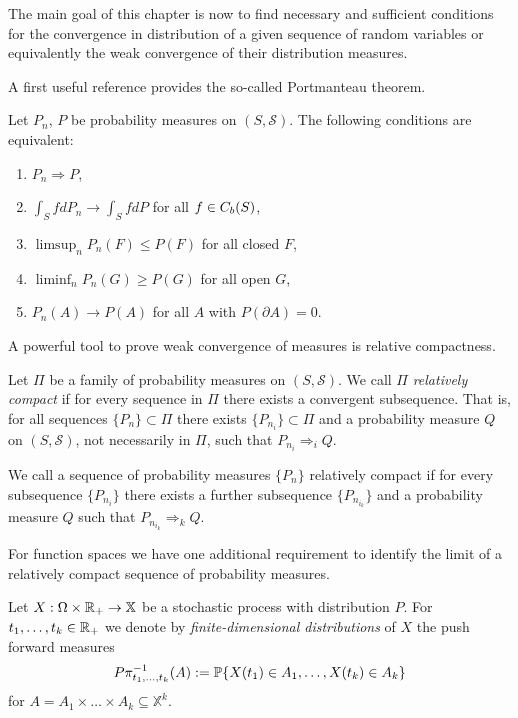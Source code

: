 The main goal of this chapter is now to find necessary and sufficient conditions
for the convergence in distribution of a given sequence of random variables 
or equivalently the weak convergence of their distribution measures.

A first useful reference provides the so-called Portmanteau theorem.
\begin{theorem} \label{T: portmanteau weak}
	Let $P_n$, $P$ be probability measures on $(S, \mathcal{S})$.
	The following conditions are equivalent:
	\begin{enumerate}
		\item $P_n \Rightarrow P$,
		\item $\int_S fdP_n \rightarrow \int_S fdP$ for all $f \in C_b(S)$,
		\item $\limsup_n P_n(F) \leq P(F)$ for all closed $F$,
		\item $\liminf_n P_n(G) \geq P(G)$ for all open $G$,
		\item $P_n(A) \rightarrow P(A)$ for all $A$ with $P(\partial A) = 0$.
	\end{enumerate}
\end{theorem}

\bigskip

A powerful tool to prove weak convergence of measures is relative compactness.
\begin{definition} \label{D: rel compactness}
	Let $\Pi$ be a family of probability measures on $(S, \mathcal{S})$.
	We call $\Pi$ \emph{relatively compact} if for every sequence in $\Pi$ there exists a convergent subsequence.
	That is, for all sequences $\{P_n\} \subset \Pi$ there exists $\{P_{n_i} \} \subset \Pi$
	and a probability measure $Q$ on $(S, \mathcal{S})$, not necessarily in $\Pi$,
	such that $P_{n_i} \Rightarrow_i Q$.
	
	We call a sequence of probability measures $\{P_n\}$ relatively compact if
	for every subsequence $\{P_{n_i}\}$ there exists a further subsequence
	$\{P_{n_{i_k}}\}$ and a probability measure $Q$ such that
	$P_{n_{i_k}} \Rightarrow_k Q$.
\end{definition}
For function spaces we have one additional requirement to identify the limit of a relatively compact sequence of probability measures.
\begin{definition} \label{D: fidi distributions}
	Let $X: \Omega \times \mathbb{R}_+ \rightarrow \mathbb{X}$ be a stochastic process with distribution $P$.
	For $t_1, \dots, t_k \in \mathbb{R}_+$ we denote by \emph{finite-dimensional distributions} of $X$ 
	the push forward measures 
	\begin{equation}
		P\pi^{-1}_{t_1, \dots, t_k}(A) := \mathbb{P}\{ X(t_1) \in A_1, \dots, X(t_k) \in A_k \}
	\end{equation}
	for $A = A_1 \times \dots \times A_k \subseteq \mathbb{X}^k$.
\end{definition}

